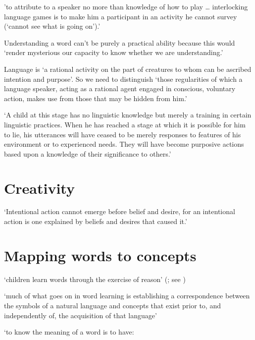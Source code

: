 \documentclass[12pt]{extarticle}
\begin{document}
\begin{multicols}{3}
'to attribute to a speaker no more than knowledge of how to play … interlocking language games is to make him a participant in an activity he cannot survey (‘cannot see what is going on’).'
\citep[p.\ 224]{Dummett:1979fb}
 
Understanding a word can’t be purely a practical ability because this would ‘render mysterious our capacity to know whether we are understanding.’
\citep[p.\ 93]{Dummett:1991yj}
 
Language is ‘a rational activity on the part of creatures to whom can be ascribed intention and purpose’.
So we need to distinguish ‘those regularities of which a language speaker, acting as a rational agent engaged in conscious, voluntary action, makes use from those that may be hidden from him.’
\citep[p.\ 104]{Dummett:1978zv}
 
‘A child at this stage has no linguistic knowledge but merely a training in certain linguistic practices.  When he has reached a stage at which it is possible for him to lie, his utterances will have ceased to be merely responses to features of his environment or to experienced needs.  They will have become purposive actions based upon a knowledge of their significance to others.’
\citep[p.\ 95]{Dummett:1991ug}
 
 
 
\section{Creativity}
 
‘Intentional action cannot emerge before belief and desire, for an intentional action is one explained by beliefs and desires that caused it.’
\citep[p.\ 10]{Davidson:1999ju}
 
 
 
\section{Mapping words to concepts}
 
‘children learn words through the exercise of reason’ 
(\citealp[p.\ 1103]{Bloom:2001ka}; see \citealp{Bloom:2000qz})
 
‘much of what goes on in word learning is establishing a correspondence between the symbols of a natural language and concepts that exist prior to, and independently of, the acquisition of that language’
 
\citep[p.\ 242]{Bloom:2000qz}
 
‘to know the meaning of a word is to have: 


\end{multicols}
\end{document}

